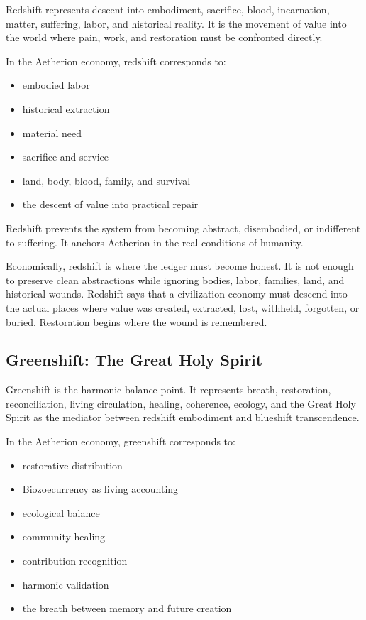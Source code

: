 \documentclass[12pt]{article}
\begin{document}
Redshift represents descent into embodiment, sacrifice, blood, incarnation, matter, suffering, labor, and historical reality. It is the movement of value into the world where pain, work, and restoration must be confronted directly.

In the Aetherion economy, redshift corresponds to:

\begin{itemize}
  \item embodied labor
  \item historical extraction
  \item material need
  \item sacrifice and service
  \item land, body, blood, family, and survival
  \item the descent of value into practical repair
\end{itemize}

Redshift prevents the system from becoming abstract, disembodied, or indifferent to suffering. It anchors Aetherion in the real conditions of humanity.

Economically, redshift is where the ledger must become honest. It is not enough to preserve clean abstractions while ignoring bodies, labor, families, land, and historical wounds. Redshift says that a civilization economy must descend into the actual places where value was created, extracted, lost, withheld, forgotten, or buried. Restoration begins where the wound is remembered.

\subsection{Greenshift: The Great Holy Spirit}

Greenshift is the harmonic balance point. It represents breath, restoration, reconciliation, living circulation, healing, coherence, ecology, and the Great Holy Spirit as the mediator between redshift embodiment and blueshift transcendence.

In the Aetherion economy, greenshift corresponds to:

\begin{itemize}
  \item restorative distribution
  \item Biozoecurrency as living accounting
  \item ecological balance
  \item community healing
  \item contribution recognition
  \item harmonic validation
  \item the breath between memory and future creation
\end{itemize}
\end{document}

